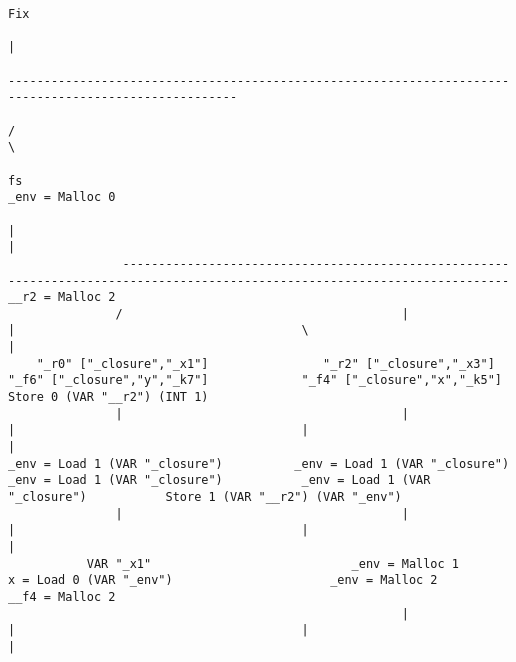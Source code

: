 \begin{landscape}
\begin{lstlisting}[basicstyle=\fontsize{6}{7.5}\selectfont\ttfamily]
                                                                                                    Fix
                                                                                                     |
                                                                                ------------------------------------------------------------------------------------------------------
                                                                               /                                                                                                      \
                                                                               fs                                                                                              _env = Malloc 0
                                                                               |                                                                                                      |
                ----------------------------------------------------------------------------------------------------------------------------                                   __r2 = Malloc 2
               /                                       |                                           |                                        \                                         |
    "_r0" ["_closure","_x1"]                "_r2" ["_closure","_x3"]                  "_f6" ["_closure","y","_k7"]             "_f4" ["_closure","x","_k5"]              Store 0 (VAR "__r2") (INT 1)
               |                                       |                                           |                                        |                                         |
_env = Load 1 (VAR "_closure")          _env = Load 1 (VAR "_closure")              _env = Load 1 (VAR "_closure")           _env = Load 1 (VAR "_closure")           Store 1 (VAR "__r2") (VAR "_env")
               |                                       |                                           |                                        |                                         |
           VAR "_x1"                            _env = Malloc 1                         x = Load 0 (VAR "_env")                      _env = Malloc 2                           __f4 = Malloc 2
                                                       |                                           |                                        |                                         |

\end{lstlisting}
\end{landscape}

